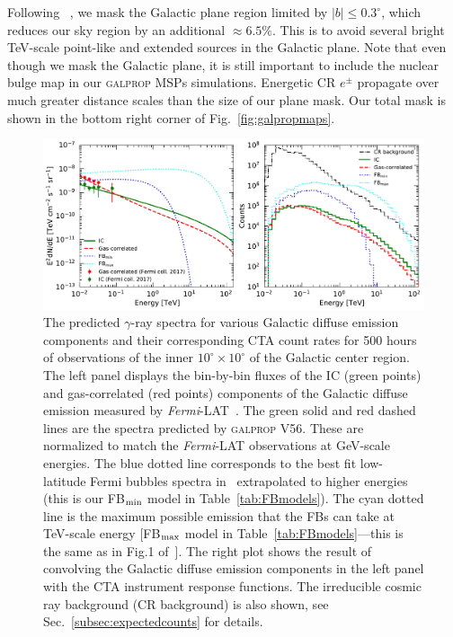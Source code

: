 \documentclass[doublespace,nopageskip]{VTthesis} %
\begin{document}
Following ~\cite{Rinchiuso:2020skh}, we mask the Galactic plane region limited by $\lvert b \rvert \leq 0.3^\circ$, which reduces our sky region by an additional $\approx 6.5\%$. This is to avoid several bright TeV-scale point-like and extended sources in the Galactic plane. Note that even though we mask the Galactic plane, it is still important to include the nuclear bulge map in our \textsc{galprop} MSPs simulations. Energetic CR $e^{\pm}$ propagate over much greater distance scales than the size of our plane mask. Our total mask is shown in the bottom right corner of Fig.~\ref{fig:galpropmaps}.

\begin{figure}
    \begin{center}
    \includegraphics[scale = 0.55]{Figures/CTA/spectra-and-counts.pdf}
\caption{The predicted $\gamma$-ray spectra for various Galactic diffuse emission components and their corresponding CTA count rates for 500 hours of observations of the inner $10^\circ \times 10^\circ$ of the Galactic center region. The left panel displays the bin-by-bin fluxes of the IC (green points) and gas-correlated (red points) components of the Galactic diffuse emission measured by \textit{Fermi}-LAT~\citep{TheFermi-LAT:2017vmf}. The green solid and red dashed lines are the spectra predicted by \textsc{galprop V56}. These are normalized to match the \textit{Fermi}-LAT observations at GeV-scale energies. The blue dotted line corresponds to the best fit low-latitude Fermi bubbles spectra in~\citep{TheFermi-LAT:2017vmf} extrapolated to higher energies (this is our FB$_{\rm min}$ model in Table~\ref{tab:FBmodels}). The cyan dotted line is the maximum possible emission that the FBs can take at TeV-scale energy [FB$_{\rm max}$ model in Table~\ref{tab:FBmodels}---this is the same as in Fig.1 of~\citet{Rinchiuso:2020skh}]. The right plot shows the result of convolving the Galactic diffuse emission components in the left panel with the CTA instrument response functions. The irreducible cosmic ray background (CR background) is also shown, see Sec.~\ref{subsec:expectedcounts} for details.}\label{fig:counts_spectra}
    \end{center}
\end{figure}
\end{document}
